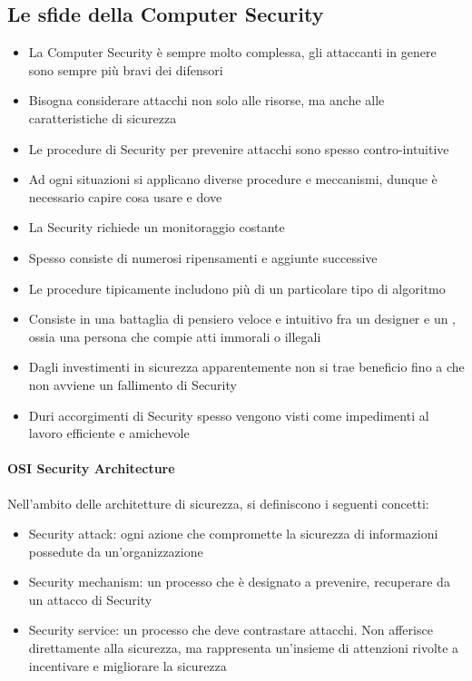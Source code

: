 \documentclass[14pt]{extreport}
\begin{document}
\subsection{Le sfide della Computer Security}
\begin{itemize}
    \item La Computer Security è sempre molto complessa, gli attaccanti in genere sono sempre più bravi dei difensori
    \item Bisogna considerare attacchi non solo alle risorse, ma anche alle caratteristiche di sicurezza
    \item Le procedure di Security per prevenire attacchi sono spesso contro-intuitive
    \item Ad ogni situazioni si applicano diverse procedure e meccanismi, dunque è necessario capire cosa usare e dove
    \item La Security richiede un monitoraggio costante
    \item Spesso consiste di numerosi ripensamenti e aggiunte successive
    \item Le procedure tipicamente includono più di un particolare tipo di algoritmo
    \item Consiste in una battaglia di pensiero veloce e intuitivo fra un designer e un , ossia una persona che compie atti immorali o illegali
    \item Dagli investimenti in sicurezza apparentemente non si trae beneficio fino a che non avviene un fallimento di Security
    \item Duri accorgimenti di Security spesso vengono visti come impedimenti al lavoro efficiente e amichevole
\end{itemize}

\paragraph{OSI Security Architecture}
Nell'ambito delle architetture di sicurezza, si definiscono i seguenti concetti:

\begin{itemize}
    \item Security attack: ogni azione che compromette la sicurezza di informazioni possedute da un'organizzazione
    \item Security mechanism: un processo che è designato a prevenire, recuperare da un attacco di Security
    \item Security service: un processo che deve contrastare attacchi. Non afferisce direttamente alla sicurezza, ma rappresenta un'insieme di attenzioni rivolte a incentivare e migliorare la sicurezza
\end{itemize}
\end{document}
